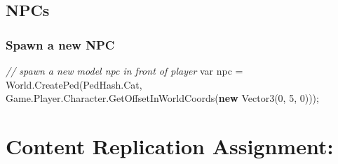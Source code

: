 \documentclass[
  openany]{book}
\newenvironment{Shaded}{\begin{snugshade}}{\end{snugshade}}
\newcommand{\CommentTok}[1]{\textcolor[rgb]{0.56,0.35,0.01}{\textit{#1}}}
\newcommand{\DataTypeTok}[1]{\textcolor[rgb]{0.13,0.29,0.53}{#1}}
\newcommand{\DecValTok}[1]{\textcolor[rgb]{0.00,0.00,0.81}{#1}}
\newcommand{\FunctionTok}[1]{\textcolor[rgb]{0.00,0.00,0.00}{#1}}
\newcommand{\KeywordTok}[1]{\textcolor[rgb]{0.13,0.29,0.53}{\textbf{#1}}}
\newcommand{\NormalTok}[1]{#1}
\begin{document}
\hypertarget{npcs}{%
\subsection{NPCs}\label{npcs}}

\hypertarget{spawn-a-new-npc}{%
\subsubsection{Spawn a new NPC}\label{spawn-a-new-npc}}

\begin{Shaded}
\begin{Highlighting}[]
\CommentTok{// spawn a new model npc in front of player}
\DataTypeTok{var}\NormalTok{ npc = World.}\FunctionTok{CreatePed}\NormalTok{(PedHash.}\FunctionTok{Cat}\NormalTok{, Game.}\FunctionTok{Player}\NormalTok{.}\FunctionTok{Character}\NormalTok{.}\FunctionTok{GetOffsetInWorldCoords}\NormalTok{(}\KeywordTok{new} \FunctionTok{Vector3}\NormalTok{(}\DecValTok{0}\NormalTok{, }\DecValTok{5}\NormalTok{, }\DecValTok{0}\NormalTok{))); }
\end{Highlighting}
\end{Shaded}

\hypertarget{content-replication-assignment-4}{%
\section{Content Replication Assignment:}\label{content-replication-assignment-4}}
\end{document}
